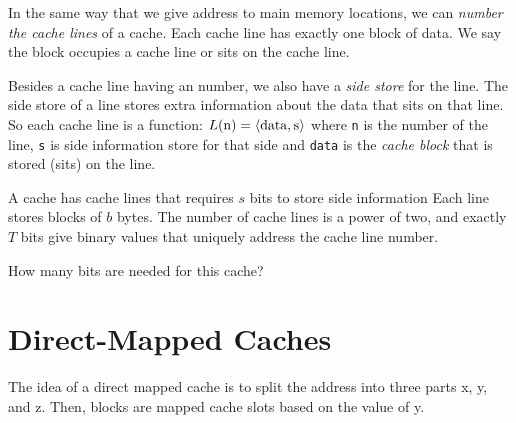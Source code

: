 In the same way that we give address to main memory locations, 
we can \textit{number the cache lines} of a cache. 
Each cache line has exactly one block of data.
We say the block occupies a cache line or sits on the cache line. 

Besides a cache line having an number, we also have a \textit{side store} for the 
line. The side store of a line stores extra information about the data that sits 
on that line. So each cache line is a function: 
$L(\text{\lstinline{n}}) =
\langle \text{\lstinline{data}}, \text{\lstinline{s}} \rangle$
where \lstinline{n} is the number of the line,
\lstinline{s} is side information store for that side and
\lstinline{data} is the \textit{cache block} that is stored (sits) on the line.

\begin{example}
A cache has cache lines that requires $s$ bits to store side information 
Each line stores blocks of $b$ bytes.
The number of cache lines is a power of two, and exactly $T$ bits 
give binary values that uniquely address the cache line number. 

How many bits are needed for this cache?
\end{example}




\section{Direct-Mapped Caches}



\begin{figure}[h]
\end{figure} 

\frmrule

The idea of a direct mapped cache is to split the address into three parts 
x, y, and z. Then, blocks are mapped cache slots based on the 
value of y. 

